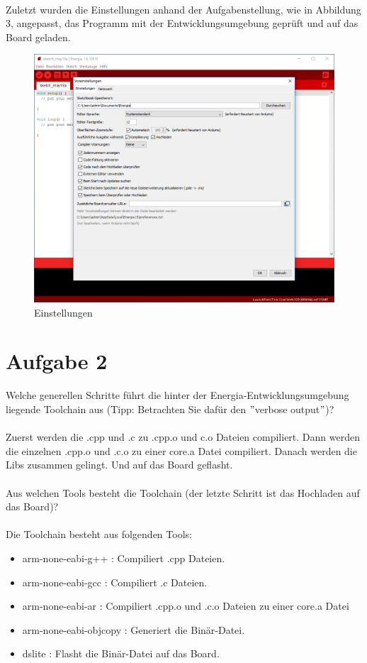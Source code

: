 \noindent \\Zuletzt wurden die Einstellungen anhand der Aufgabenstellung, wie in Abbildung 3, angepasst, das Programm mit der Entwicklungsumgebung geprüft und auf das Board geladen.
\begin{figure}[h]
	\centering
	\includegraphics[width=0.7\linewidth]{images/Settings}
	\caption{Einstellungen}
\end{figure}
\newpage
\section{Aufgabe 2}
Welche generellen Schritte führt die hinter der Energia-Entwicklungsumgebung liegende Toolchain aus (Tipp: Betrachten Sie dafür den $"$verbose output$"$)?\\ \\
Zuerst werden die  .cpp und .c zu .cpp.o und c.o Dateien compiliert. Dann werden die einzelnen .cpp.o und .c.o zu einer core.a Datei compiliert. Danach werden die Libs zusammen gelingt.
Und auf das Board geflasht.\\ \\
Aus welchen Tools besteht die Toolchain (der letzte Schritt ist das Hochladen auf das Board)?\\ \\
Die Toolchain besteht aus folgenden Tools:
\begin{itemize}
\item arm-none-eabi-g++     : Compiliert .cpp Dateien.
\item arm-none-eabi-gcc     : Compiliert .c Dateien.
\item arm-none-eabi-ar      : Compiliert .cpp.o und .c.o Dateien zu einer core.a Datei
\item arm-none-eabi-objcopy : Generiert die Binär-Datei.
\item dslite                : Flasht die Binär-Datei auf das Board.
\end{itemize}
